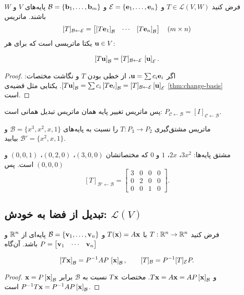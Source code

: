 \begin{theorem}\label{thm:matrix-of-map}
فرض کنید $T\in\mathcal{L}(V,W)$ و $\mathcal{E}=\{\mathbf{e}_1,\dots,\mathbf{e}_n\}$ و $\mathcal{B}=\{\mathbf{b}_1,\dots,\mathbf{b}_m\}$ پایه‌های $V$ و $W$ باشند. ماتریس
\[
[T]_{\mathcal{B}\leftarrow\mathcal{E}}=\begin{bmatrix}\left[T\mathbf{e}_1\right]_{\mathcal{B}}&\cdots&\left[T\mathbf{e}_n\right]_{\mathcal{B}}\end{bmatrix}\quad(m\times n)
\]
یکتا ماتریسی است که برای هر $\mathbf{u}\in V$:
\begin{keyformula}
\[
\left[T\mathbf{u}\right]_{\mathcal{B}}=[T]_{\mathcal{B}\leftarrow\mathcal{E}}\,\left[\mathbf{u}\right]_{\mathcal{E}}.
\]
\end{keyformula}
\end{theorem}
\begin{proof}
اگر $\mathbf{u}=\sum c_i\mathbf{e}_i$، از خطی بودن $T$ و نگاشت مختصات: $\left[T\mathbf{u}\right]_{\mathcal{B}}=\sum c_i\left[T\mathbf{e}_i\right]_{\mathcal{B}}=[T]_{\mathcal{B}\leftarrow\mathcal{E}}\left[\mathbf{u}\right]_{\mathcal{E}}$. یکتایی مثل قضیه‌ی \ref{thm:change-basis} است.
\end{proof}

پس ماتریس تغییر پایه همان ماتریس تبدیل همانی است: $P_{\mathcal{C}\leftarrow\mathcal{B}}=[I]_{\mathcal{C}\leftarrow\mathcal{B}}$.

\begin{example}
ماتریس مشتق‌گیری $T:P_3\to P_2$ را نسبت به پایه‌های $\mathcal{B}=\{x^3,x^2,x,1\}$ و $\mathcal{B}'=\{x^2,x,1\}$ بیابید.
\end{example}
\begin{solution}
مشتق پایه‌ها: $3x^2$، $2x$، $1$ و $0$ که مختصاتشان $(3,0,0)$، $(0,2,0)$، $(0,0,1)$ و $(0,0,0)$ است. پس
\[
[T]_{\mathcal{B}'\leftarrow\mathcal{B}}=\begin{bmatrix}3&0&0&0\\0&2&0&0\\0&0&1&0\end{bmatrix}.
\]
\end{solution}

\subsection*{تبدیل از فضا به خودش: $\mathcal{L}(V)$}

\begin{theorem}[تشابه]\label{thm:similarity}
فرض کنید $T:\mathbb{R}^n\to\mathbb{R}^n$ با $T(\mathbf{x})=A\mathbf{x}$ و $\mathcal{B}=\{\mathbf{v}_1,\dots,\mathbf{v}_n\}$ پایه‌ای از $\mathbb{R}^n$ و $P=\begin{bmatrix}\mathbf{v}_1&\cdots&\mathbf{v}_n\end{bmatrix}$ باشد. آن‌گاه
\begin{keyformula}
\[
\left[T\mathbf{x}\right]_{\mathcal{B}}=P^{-1}AP\,\left[\mathbf{x}\right]_{\mathcal{B}},\qquad [T]_{\mathcal{B}}=P^{-1}[T]_{\mathcal{E}}P .
\]
\end{keyformula}
\end{theorem}
\begin{proof}
$\mathbf{x}=P\left[\mathbf{x}\right]_{\mathcal{B}}$ و $T\mathbf{x}=A\mathbf{x}=AP\left[\mathbf{x}\right]_{\mathcal{B}}$. مختصات $T\mathbf{x}$ نسبت به $\mathcal{B}$ برابر $P^{-1}T\mathbf{x}=P^{-1}AP\left[\mathbf{x}\right]_{\mathcal{B}}$ است.
\end{proof}

